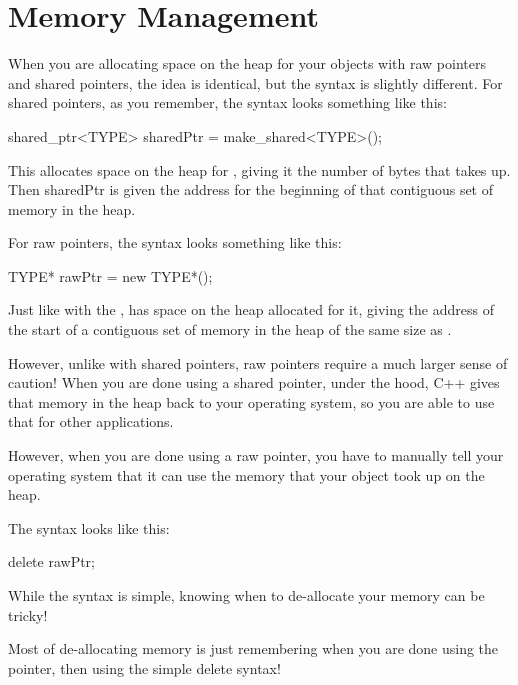 \documentclass{tufte-handout}
\begin{document}
\section{Memory Management}
When you are allocating space on the heap for your objects with raw pointers and shared pointers, the idea is identical, but the syntax is slightly different.
For shared pointers, as you remember, the syntax looks something like this:
\begin{Code}
    shared_ptr<TYPE> sharedPtr = make_shared<TYPE>();
\end{Code}
This allocates space on the heap for , giving it the number of bytes that  takes up.
Then sharedPtr is given the address for the beginning of that contiguous set of memory in the heap.


For raw pointers, the syntax looks something like this:

\begin{Code}
    TYPE* rawPtr = new TYPE*();
\end{Code}
Just like with the ,  has space on the heap allocated for it, giving  the address of the start of a contiguous set of memory in the heap of the same size as .


However, unlike with shared pointers, raw pointers require a much larger sense of caution!
When you are done using a shared pointer, under the hood, C++ gives that memory in the heap back to your operating system, so you are able to use that for other applications. 

However, when you are done using a raw pointer, you have to manually tell your operating system that it can use the memory that your object took up on the heap.

The syntax looks like this:

\begin{Code}
    delete rawPtr;
\end{Code}


While the syntax is simple, knowing when to de-allocate your memory can be tricky!


Most of de-allocating memory is just remembering when you are done using the pointer, then using the simple delete syntax!
\end{document}
